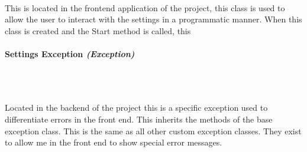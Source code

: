 \begin{FlushLeft}
    \begin{figure}[H]
        \centering
    \end{figure}\\
    This is located in the frontend application of the project, this class is used to allow the user to interact with the settings in a programmatic manner. When this class is created and the Start method is called, this 
    \bk

    \pagebreak
\paragraph{Settings Exception \textit{(Exception)}} \mbox{} \\

    \begin{figure}[H]
        \centering
    \end{figure}\\
    Located in the backend of the project this is a specific exception used to differentiate errors in the front end. This inherits the methods of the base exception class. This is the same as all other custom exception classes. They exist to allow me in the front end to show special error messages.
    \bk


\end{FlushLeft}
